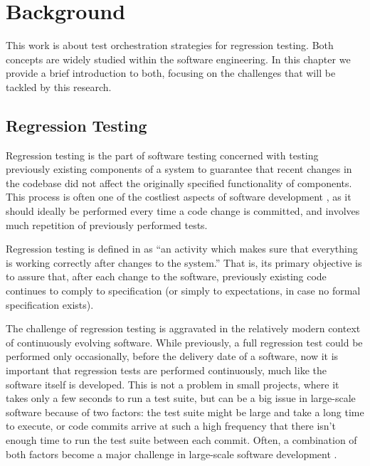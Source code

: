 \chapter{Background}\label{chap:background}

This work is about test orchestration strategies for regression testing.
Both concepts are widely studied within the software engineering.
In this chapter we provide a brief introduction to both, focusing on the challenges that will be tackled by this research.



\section{Regression Testing}\label{sec:regression}
Regression testing is the part of software testing concerned with testing previously existing components of a system to guarantee that recent changes in the codebase did not affect the originally specified functionality of components.
This process is often one of the costliest aspects of software development \cite{rothermel_improving_2018}, as it should ideally be performed every time a code change is committed, and involves much repetition of previously performed tests.

Regression testing is defined in \cite{minhas_regression_2017} as ``an activity which makes sure that everything is working correctly after changes to the system.''
That is, its primary objective is to assure that, after each change to the software, previously existing code continues to comply to specification (or simply to expectations, in case no formal specification exists).

The challenge of regression testing is aggravated in the relatively modern context of continuously evolving software.
While previously, a full regression test could be performed only occasionally, before the delivery date of a software, now it is important that regression tests are performed continuously, much like the software itself is developed.
This is not a problem in small projects, where it takes only a few seconds to run a test suite, but can be a big issue in large-scale software because of two factors: the test suite might be large and take a long time to execute, or code commits arrive at such a high frequency that there isn't enough time to run the test suite between each commit.
Often, a combination of both factors become a major challenge in large-scale software development \cite{memon_taming_2017}.

